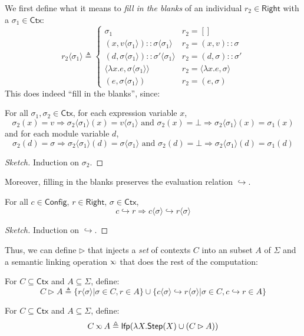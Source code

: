 \documentclass[acmsmall,screen,review]{acmart}\settopmatter{printfolios=true,printccs=false,printacmref=false}
\theoremstyle{acmdefinition}
\newcommand*{\cons}{::}
\newcommand*{\modid}{d}
\newcommand*{\ctx}{\sigma}
\newcommand*{\Ctx}{\mathsf{Ctx}}
\newcommand*{\Config}{\mathsf{Config}}
\newcommand*{\config}{c}
\newcommand*{\Right}{\mathsf{Right}}
\newcommand*{\rightst}{r}
\newcommand*{\lfp}{\mathsf{lfp}}
\newcommand*{\Step}{\mathsf{Step}}
\newcommand*{\semarrow}{\hookrightarrow}
\newcommand*{\semlink}{\mathbin{\rotatebox[origin=c]{180}{$\propto$}}}
\newcommand*{\inject}[2]{{#2}\langle{#1}\rangle}
\begin{document}
We first define what it means to \emph{fill in the blanks} of an individual $r_2\in\Right$ with a $\ctx_1\in\Ctx$:
\[
  \inject{\ctx_{1}}{r_{2}}\triangleq
  \begin{cases}
    \ctx_1                                                         & r_{2}=[]                           \\
    (x, \inject{\ctx_1}{v})\cons\inject{\ctx_{1}}{\ctx}            & r_{2}=(x,v)\cons \ctx              \\
    (\modid, \inject{\ctx_{1}}{\ctx})\cons\inject{\ctx_{1}}{\ctx'} & r_{2}=(\modid,\ctx)\cons \ctx'     \\
    \langle\lambda x.e,\inject{\ctx_1}{\ctx}\rangle                & r_2=\langle\lambda x.e,\ctx\rangle \\
    (e,\inject{\ctx_1}{\ctx})                                      & r_2 = (e, \ctx)
  \end{cases}
\]
This does indeed ``fill in the blanks'', since:
\begin{lemma}
  For all $\ctx_1,\ctx_2\in\Ctx$, for each expression variable $x$,
  \[
    \ctx_2(x)=v\Rightarrow\inject{\ctx_1}{\ctx_2}(x)=\inject{\ctx_1}{v}\text{ and }\ctx_2(x)=\bot\Rightarrow\inject{\ctx_1}{\ctx_2}(x)=\ctx_1(x)
  \]
  and for each module variable $\modid$,
  \[
    \ctx_2(\modid)=\ctx\Rightarrow\inject{\ctx_1}{\ctx_2}(d)=\inject{\ctx_1}{\ctx}\text{ and }\ctx_2(\modid)=\bot\Rightarrow\inject{\ctx_1}{\ctx_2}(\modid)=\ctx_1(\modid)
  \]
\end{lemma}
\begin{proof}[Sketch]
  Induction on $\ctx_2$.
\end{proof}

Moreover, filling in the blanks preserves the evaluation relation $\semarrow$.
\begin{lemma}[Injection Preserves $\semarrow$]\label{lem:injpreseval}
  For all $\config\in\Config$, $\rightst\in\Right$, $\ctx\in\Ctx$,
  \[\config\semarrow\rightst\Rightarrow\inject{\ctx}{\config}\semarrow\inject{\ctx}{\rightst}\]
\end{lemma}
\begin{proof}[Sketch]
  Induction on $\semarrow$.
\end{proof}

Thus, we can define $\rhd$ that injects a \emph{set} of contexts $C$ into an subset $A$ of $\Sigma$ and a semantic linking operation $\semlink$ that does the rest of the computation:
\begin{definition}[Injection]
  For $C\subseteq\Ctx$ and $A\subseteq\Sigma$, define:
  \[C\rhd A\triangleq\{\inject{\ctx}{\rightst}|\ctx\in C,\rightst\in A\}\cup\{\inject{\ctx}{\config}\semarrow\inject{\ctx}{\rightst}|\ctx\in C,\config\semarrow\rightst\in A\}\]
\end{definition}
\begin{definition}
  For $C\subseteq\Ctx$ and $A\subseteq \Sigma$, define:
  \[C\semlink A\triangleq\lfp(\lambda X.\Step(X)\cup(C\rhd A))\]
\end{definition}
\end{document}
